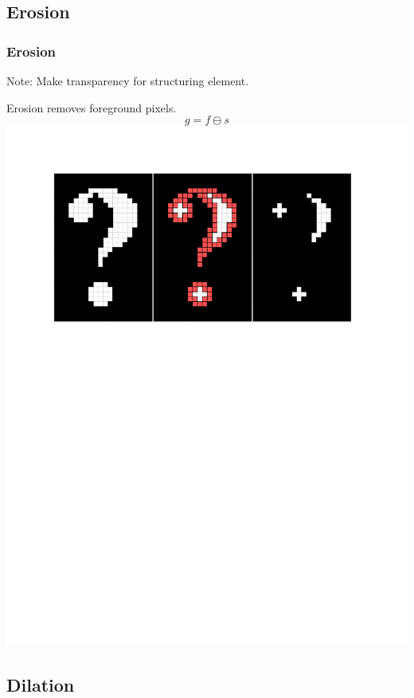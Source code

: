 \documentclass{beamer}
\begin{document}
\subsection[Erosion]{Erosion}

\begin{frame}
\frametitle{Erosion}
{\Large Note: Make transparency for structuring element.}
\begin{center}
Erosion removes foreground pixels.
\begin{equation*}
g = f \ominus s
\end{equation*}
\includegraphics[width=1\textwidth,trim={0 0 0 0.5in},clip]{erosion}
\end{center}
\end{frame}

\subsection[Dilation]{Dilation}
\end{document}
